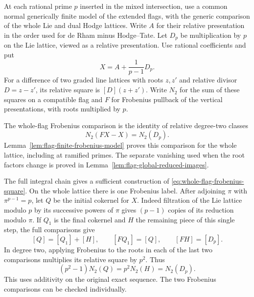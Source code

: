 \begin{definition}\label{hyp:integral-flag-frobenius-chain}
At each rational prime \(p\) inserted in the mixed intersection, use a common normal generically finite model of the extended flags, with the generic comparison of the whole Lie and dual Hodge lattices. Write \(A\) for their relative presentation in the order used for de Rham minus Hodge--Tate. Let \(D_p\) be multiplication by \(p\) on the Lie lattice, viewed as a relative presentation. Use rational coefficients and put
\[
               X=A+\frac{1}{p-1}D_p .
\]
For a difference of two graded line lattices with roots \(z,z'\) and relative divisor \(D=z-z'\), its relative square is \([D](z+z')\). Write \(N_2\) for the sum of these squares on a compatible flag and \(F\) for Frobenius pullback of the vertical presentations, with roots multiplied by \(p\).

The whole-flag Frobenius comparison is the identity of relative degree-two classes
\begin{equation}\label{eq:whole-flag-frobenius-square}
            N_2(FX-X)=N_2(D_p).
\end{equation}
Lemma~\ref{lem:flag-finite-frobenius-model} proves this comparison for the whole lattice, including at ramified primes. The separate vanishing used when the root factors change is proved in
Lemma~\ref{lem:flag-global-reduced-images}.
\end{definition}

The full integral chain gives a sufficient construction of \eqref{eq:whole-flag-frobenius-square}. On the whole lattice there is one Frobenius label. After adjoining \(\pi\) with \(\pi^{p-1}=p\), let \(Q\) be the initial cokernel for \(X\). Indeed filtration of the Lie lattice modulo \(p\) by its successive powers of \(\pi\) gives \((p-1)\) copies of its reduction modulo \(\pi\). If \(Q_1\) is the final cokernel and \(H\) the remaining piece of this single step, the full comparisons give
\[
 [Q]=[Q_1]+[H],\qquad [FQ_1]=[Q],\qquad [FH]=[D_p].
\]
In degree two, applying Frobenius to the roots in each of the last two comparisons multiplies its relative square by \(p^2\). Thus
\[
 (p^2-1)N_2(Q)=p^2N_2(H)=N_2(D_p).
\]
This uses additivity on the original exact sequence. The two Frobenius comparisons can be checked individually.

